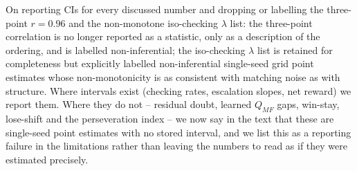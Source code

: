 \documentclass[11pt,a4paper]{article}
\begin{document}
On reporting CIs for every discussed number and dropping or labelling the three-point $r=0.96$ and the non-monotone iso-checking $\lambda$ list: the three-point correlation is no longer reported as a statistic, only as a description of the ordering, and is labelled non-inferential; the iso-checking $\lambda$ list is retained for completeness but explicitly labelled non-inferential single-seed grid point estimates whose non-monotonicity is as consistent with matching noise as with structure. Where intervals exist (checking rates, escalation slopes, net reward) we report them. Where they do not -- residual doubt, learned $Q_{MF}$ gaps, win-stay, lose-shift and the perseveration index -- we now say in the text that these are single-seed point estimates with no stored interval, and we list this as a reporting failure in the limitations rather than leaving the numbers to read as if they were estimated precisely.
\end{document}
